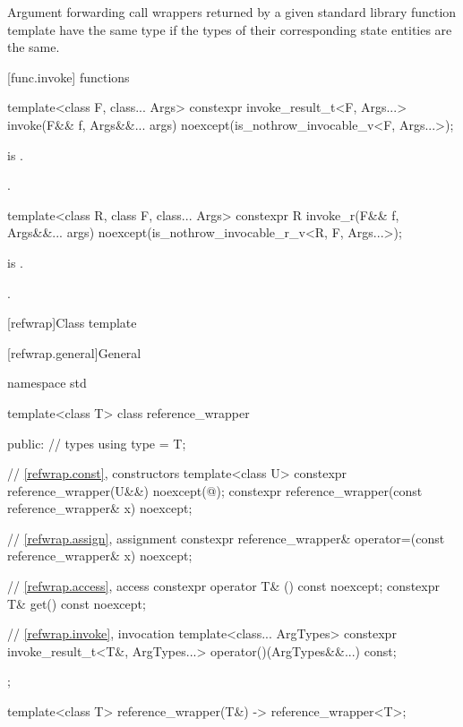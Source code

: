 \pnum
Argument forwarding call wrappers returned by
a given standard library function template have the same type
if the types of their corresponding state entities are the same.

[func.invoke]{ functions}
%
%
\begin{itemdecl}
template<class F, class... Args>
  constexpr invoke_result_t<F, Args...> invoke(F&& f, Args&&... args)
    noexcept(is_nothrow_invocable_v<F, Args...>);
\end{itemdecl}

\begin{itemdescr}
\pnum
\constraints
{} is .

\pnum
\returns
{}.
\end{itemdescr}

%
\begin{itemdecl}
template<class R, class F, class... Args>
  constexpr R invoke_r(F&& f, Args&&... args)
    noexcept(is_nothrow_invocable_r_v<R, F, Args...>);
\end{itemdecl}

\begin{itemdescr}
\pnum
\constraints
{} is .

\pnum
\returns
{}.
\end{itemdescr}

[refwrap]{Class template }

[refwrap.general]{General}

%
%
\begin{codeblock}
namespace std {
  template<class T> class reference_wrapper {
  public:
    // types
    using type = T;

    // \ref{refwrap.const}, constructors
    template<class U>
      constexpr reference_wrapper(U&&) noexcept(@\seebelow@);
    constexpr reference_wrapper(const reference_wrapper& x) noexcept;

    // \ref{refwrap.assign}, assignment
    constexpr reference_wrapper& operator=(const reference_wrapper& x) noexcept;

    // \ref{refwrap.access}, access
    constexpr operator T& () const noexcept;
    constexpr T& get() const noexcept;

    // \ref{refwrap.invoke}, invocation
    template<class... ArgTypes>
      constexpr invoke_result_t<T&, ArgTypes...> operator()(ArgTypes&&...) const;
  };

  template<class T>
    reference_wrapper(T&) -> reference_wrapper<T>;
}
\end{codeblock}

